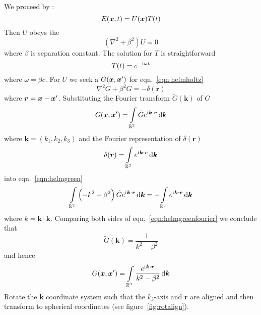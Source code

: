 We proceed by :
%
\begin{equation}
    E(\bm{x}, t) = U(\bm{x}) T(t)\label{eqn:sepvar}
\end{equation}
%
Then \(U\) obeys the 
%
\begin{equation}
    (\nabla ^{2}+\beta^{2})U=0\label{eqn:helmholtz}
\end{equation}
%
where \(\beta\) is separation constant.
%
The solution for \(T\) is straightforward
\begin{equation}
    T(t) = e^{-\mathrm{i}\mkern1mu \omega t} 
\end{equation}
%
where \(\omega = \beta c\).
%
For \(U\) we seek a  \(G(\bm{x},\bm{x}')\) for eqn.~\eqref{eqn:helmholtz}
%
\begin{equation}
    \nabla^2 G + \beta^2 G = -\delta(\bm{r})\label{eqn:helmgreen}
\end{equation}
%
where \(\bm{r} = \bm{x} - \bm{x}'\).
%
Substituting the Fourier transform \(\tilde{G}(\bm{k})\) of \(G\)
%
\begin{equation}
    G(\bx, \bx') = \int\limits_{\mathbb{R}^3} \tilde{G} e^{\iu \bm{k}\cdot \bm{r}} \dif \bm{k}
\end{equation}
%
where \(\bm{k} = \left(k_1, k_2, k_3\right)\) and the Fourier representation of \(\delta(\bm{r})\)
\begin{equation}
    \delta(\bm{r}) = \int\limits_{\mathbb{R}^3} e^{\iu \bm{k} \cdot \bm{r}} \dif \bm{k}
\end{equation}
%
into eqn.~\eqref{eqn:helmgreen}
%
\begin{equation}
    \int\limits_{\mathbb{R}^3} \left(-k^2 +\beta^2 \right) \tilde{G}e^{\iu \bm{k}\cdot \bm{r}} \dif \bm{k} = - \int\limits_{\mathbb{R}^3} e^{\iu \bm{k}\cdot \bm{r}} \dif \bm{k}\label{eqn:helmgreenfourier}
\end{equation}
%
where \(k = \bm{k}\cdot\bm{k}\).
%
Comparing both sides of eqn.~\eqref{eqn:helmgreenfourier} we conclude that
%
\begin{equation}
    \tilde{G}(\bm{k}) = \frac{1}{k^2-\beta^2}
\end{equation}
%
and hence
%
\begin{equation}
    G(\bx, \bx') = \int\limits_{\mathbb{R}^3} \frac{e^{\iu \bm{k}\cdot \bm{r}}}{k^2-\beta^2}  \dif \bm{k}
\end{equation}
%
Rotate the \(\bm{k}\) coordinate system such that the \(k_3\)-axis and \(\bm{r}\) are aligned and then transform to spherical coordinates (see figure~\ref{fig:rotalign}).
